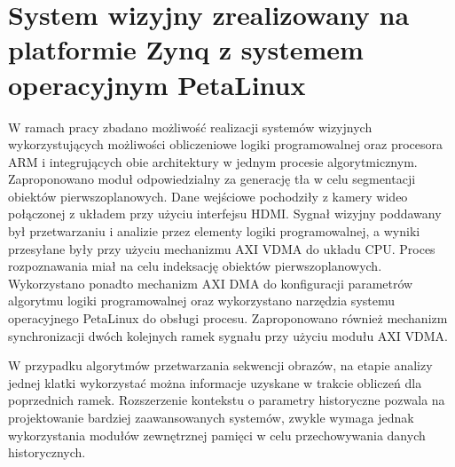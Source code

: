 \chapter{System wizyjny zrealizowany na platformie Zynq z systemem operacyjnym PetaLinux}
\label{cha:project}


W ramach pracy zbadano możliwość realizacji systemów wizyjnych wykorzystujących możliwości obliczeniowe logiki programowalnej oraz procesora ARM i integrujących obie architektury w jednym procesie algorytmicznym. Zaproponowano moduł odpowiedzialny za generację tła w celu segmentacji obiektów pierwszoplanowych. 
Dane wejściowe pochodziły z kamery wideo połączonej z układem przy użyciu interfejsu HDMI. Sygnał wizyjny poddawany był przetwarzaniu i analizie przez elementy logiki programowalnej, a wyniki przesyłane były przy użyciu mechanizmu AXI VDMA do układu CPU. Proces rozpoznawania miał na celu indeksację obiektów pierwszoplanowych. Wykorzystano ponadto mechanizm AXI DMA do konfiguracji parametrów algorytmu logiki programowalnej oraz wykorzystano narzędzia systemu operacyjnego PetaLinux do obsługi procesu. Zaproponowano również mechanizm synchronizacji dwóch kolejnych ramek sygnału przy użyciu modułu AXI VDMA.


W przypadku algorytmów przetwarzania sekwencji obrazów, na etapie analizy jednej klatki wykorzystać można informacje uzyskane w trakcie obliczeń dla poprzednich ramek. 
Rozszerzenie kontekstu o parametry historyczne pozwala na projektowanie bardziej zaawansowanych systemów, zwykle wymaga jednak wykorzystania modułów zewnętrznej pamięci w celu przechowywania danych historycznych.

